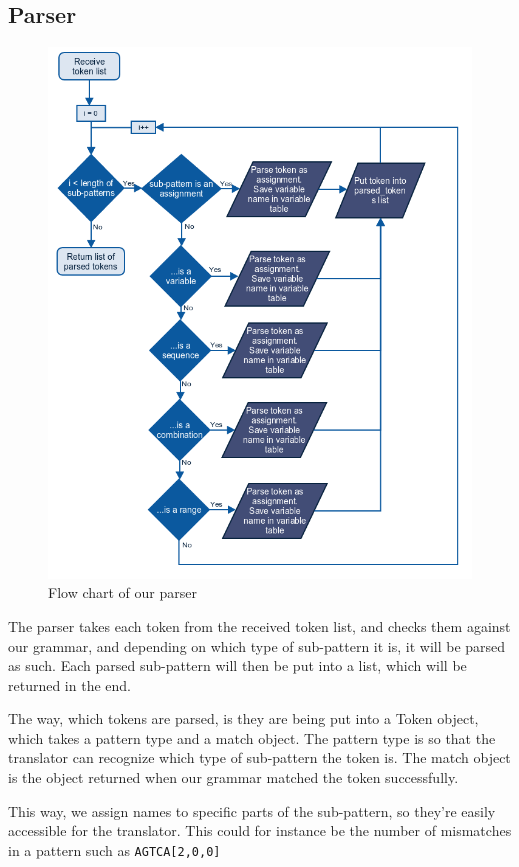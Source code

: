 \documentclass[12pt]{article}
\begin{document}
\subsection{Parser}
\begin{figure}[H]
	\begin{center}
		\includegraphics[scale=0.65]{parser.png}
	\end{center}	
	\caption{Flow chart of our parser}
\end{figure}

The parser takes each token from the received token list, and checks them against our grammar, and depending on which type of sub-pattern it is, it will be parsed as such. Each parsed sub-pattern will then be put into a list, which will be returned in the end.

The way, which tokens are parsed, is they are being put into a Token object, which takes a pattern type and a match object. The pattern type is so that the translator can recognize which type of sub-pattern the token is. The match object is the object returned when our grammar matched the token successfully. 

This way, we assign names to specific parts of the sub-pattern, so they're easily accessible for the translator. This could for instance be the number of mismatches in a pattern such as \texttt{AGTCA[2,0,0]}

\newpage



\end{document}
